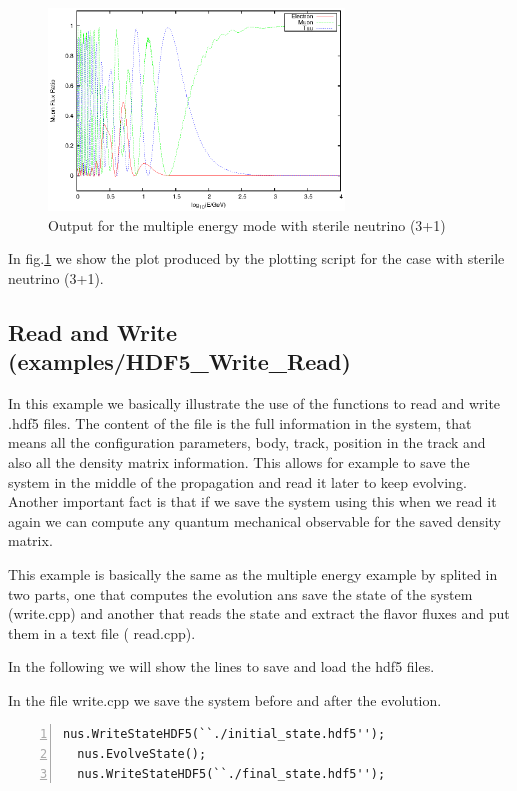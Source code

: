 \begin{figure}[h!]
  \label{fig:multimode}
  \centering
  \includegraphics[width=0.7\textwidth]{fig/Multiplot.eps} 
  \caption{Output for the multiple energy mode with sterile neutrino (3+1)} 
\end{figure}
 
In fig.\ref{fig:multimode} we show the plot produced by the plotting
script for the case with sterile neutrino (3+1).

\subsection{Read and Write \textnormal{({\ttf examples/HDF5\_Write\_Read})}}

In this example we basically illustrate the use of the functions to
read and write {\ttf .hdf5} files. The content of the file is the full
information in the system, that means all the configuration
parameters, body, track, position in the track and also all the
density matrix information. This allows for example to save the system
in the middle of the propagation and read it later to keep
evolving. Another important fact is that if we save the system using
this when we read it again we can compute any quantum mechanical
observable for the saved density matrix.

This example is basically the same as the multiple energy example by
splited in two parts, one that computes the evolution ans save the
state of the system ({\ttf write.cpp}) and another that reads the
state and extract the flavor fluxes and put them in a text file ({\ttf
  read.cpp}).

In the following we will show the lines to save and load the hdf5
files.

In the file {\ttf write.cpp} we save the system before and after the
evolution.
\begin{lstlisting}[frame=leftline, numbers =
  left,breaklines=true,label = ex:sin1]
  nus.WriteStateHDF5(``./initial_state.hdf5'');
  nus.EvolveState();
  nus.WriteStateHDF5(``./final_state.hdf5'');
\end{lstlisting}


